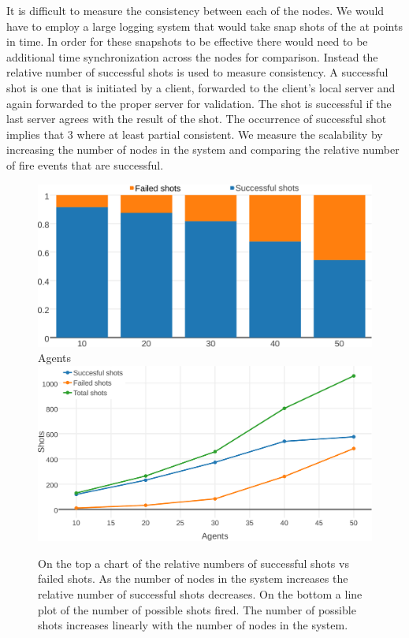 It is difficult to measure the consistency between each of the nodes. 
We would have to employ a large logging system that would take snap shots of the \gamestate at points in time. 
In order for these snapshots to be effective there would need to be additional time synchronization across the nodes for comparison. 
Instead the relative number of successful shots is used to measure consistency. 
A successful shot is one that is initiated by a client, forwarded to the client's local server and again forwarded to the proper server for validation. 
The shot is successful if the last server agrees with the result of the shot. 
The occurrence of successful shot implies that $3$ \gamestates where at least partial consistent.
We measure the scalability by increasing the number of nodes in the system and comparing the relative number of fire events that are successful. 
	\begin{figure}[htb!]
	\centering
		\includegraphics[width=0.85\linewidth]{../images/agents-vs-consistency-via-shots-crop.pdf} \\
		Agents \\
		\includegraphics[width=0.85\linewidth]{../images/shots-vs-agents-crop.pdf} \\
		\caption{\label{figure:nodes-vs-shots-consistency} On the top a chart of the relative numbers of successful shots vs failed shots. As the number of nodes in the system increases the relative number of successful shots decreases. On the bottom a line plot of the number of possible shots fired. The number of possible shots increases linearly with the number of nodes in the system.}
	\end{figure}
